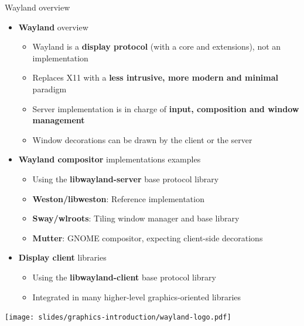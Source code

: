 \begin{frame}{Wayland overview}
  \begin{itemize}
  \item \textbf{Wayland} overview
    \begin{itemize}
    \item Wayland is a \textbf{display protocol} (with a core and extensions), not an implementation
    \item Replaces X11 with a \textbf{less intrusive, more modern and minimal} paradigm
    \item Server implementation is in charge of \textbf{input, composition and window management}
    \item Window decorations can be drawn by the client or the server
    \end{itemize}
  \end{itemize}
  \begin{minipage}[b]{0.8\textwidth}
  \begin{itemize}
  \item \textbf{Wayland compositor} implementations examples
    \begin{itemize}
    \item Using the \textbf{libwayland-server} base protocol library
    \item \textbf{Weston/libweston}: Reference implementation
    \item \textbf{Sway/wlroots}: Tiling window manager and base library
    \item \textbf{Mutter}: GNOME compositor, expecting client-side decorations
    \end{itemize}
  \item \textbf{Display client} libraries
    \begin{itemize}
    \item Using the \textbf{libwayland-client} base protocol library
    \item Integrated in many higher-level graphics-oriented libraries
    \end{itemize}
  \end{itemize}
  \end{minipage}
  \begin{minipage}[b]{0.15\textwidth}
  \texttt{[image: slides/graphics-introduction/wayland-logo.pdf]}
  \end{minipage}
\end{frame}

